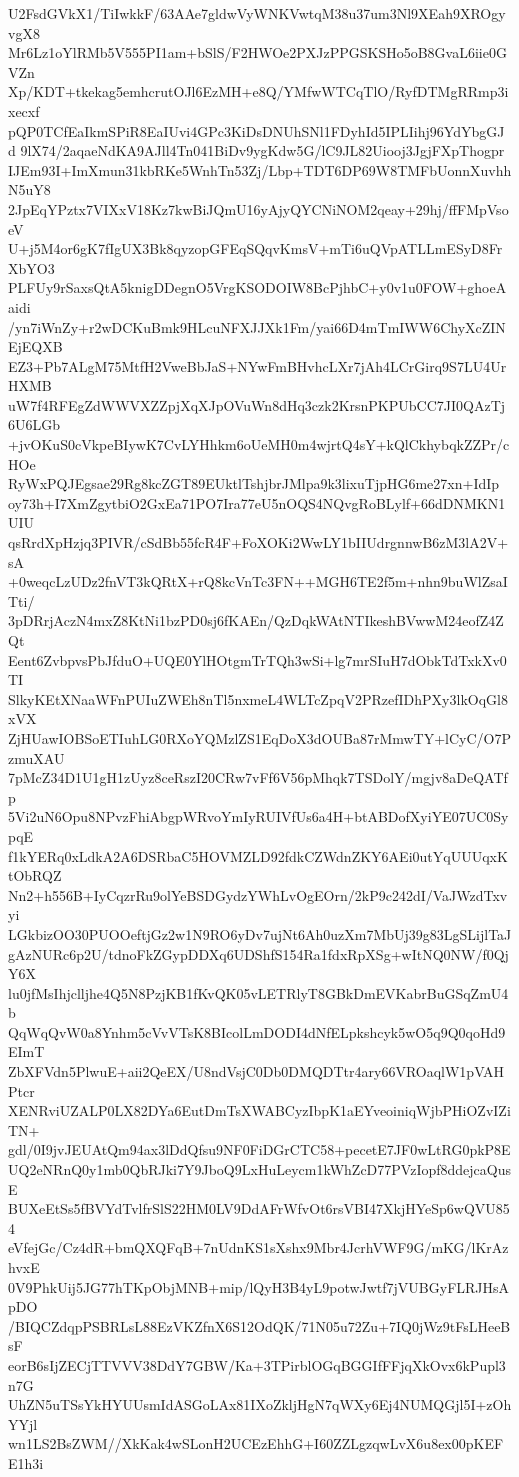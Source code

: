 U2FsdGVkX1/TiIwkkF/63AAe7gldwVyWNKVwtqM38u37um3Nl9XEah9XROgyvgX8
Mr6Lz1oYlRMb5V555PI1am+bSlS/F2HWOe2PXJzPPGSKSHo5oB8GvaL6iie0GVZn
Xp/KDT+tkekag5emhcrutOJl6EzMH+e8Q/YMfwWTCqTlO/RyfDTMgRRmp3ixecxf
pQP0TCfEaIkmSPiR8EaIUvi4GPc3KiDsDNUhSNl1FDyhId5IPLIihj96YdYbgGJd
9lX74/2aqaeNdKA9AJll4Tn041BiDv9ygKdw5G/lC9JL82Uiooj3JgjFXpThogpr
IJEm93I+ImXmun31kbRKe5WnhTn53Zj/Lbp+TDT6DP69W8TMFbUonnXuvhhN5uY8
2JpEqYPztx7VIXxV18Kz7kwBiJQmU16yAjyQYCNiNOM2qeay+29hj/ffFMpVsoeV
U+j5M4or6gK7fIgUX3Bk8qyzopGFEqSQqvKmsV+mTi6uQVpATLLmESyD8FrXbYO3
PLFUy9rSaxsQtA5knigDDegnO5VrgKSODOIW8BcPjhbC+y0v1u0FOW+ghoeAaidi
/yn7iWnZy+r2wDCKuBmk9HLcuNFXJJXk1Fm/yai66D4mTmIWW6ChyXcZINEjEQXB
EZ3+Pb7ALgM75MtfH2VweBbJaS+NYwFmBHvhcLXr7jAh4LCrGirq9S7LU4UrHXMB
uW7f4RFEgZdWWVXZZpjXqXJpOVuWn8dHq3czk2KrsnPKPUbCC7JI0QAzTj6U6LGb
+jvOKuS0cVkpeBIywK7CvLYHhkm6oUeMH0m4wjrtQ4sY+kQlCkhybqkZZPr/cHOe
RyWxPQJEgsae29Rg8kcZGT89EUktlTshjbrJMlpa9k3lixuTjpHG6me27xn+IdIp
oy73h+I7XmZgytbiO2GxEa71PO7Ira77eU5nOQS4NQvgRoBLylf+66dDNMKN1UIU
qsRrdXpHzjq3PIVR/cSdBb55fcR4F+FoXOKi2WwLY1bIIUdrgnnwB6zM3lA2V+sA
+0weqcLzUDz2fnVT3kQRtX+rQ8kcVnTc3FN++MGH6TE2f5m+nhn9buWlZsaITti/
3pDRrjAczN4mxZ8KtNi1bzPD0sj6fKAEn/QzDqkWAtNTIkeshBVwwM24eofZ4ZQt
Eent6ZvbpvsPbJfduO+UQE0YlHOtgmTrTQh3wSi+lg7mrSIuH7dObkTdTxkXv0TI
SlkyKEtXNaaWFnPUIuZWEh8nTl5nxmeL4WLTcZpqV2PRzefIDhPXy3lkOqGl8xVX
ZjHUawIOBSoETIuhLG0RXoYQMzlZS1EqDoX3dOUBa87rMmwTY+lCyC/O7PzmuXAU
7pMcZ34D1U1gH1zUyz8ceRszI20CRw7vFf6V56pMhqk7TSDolY/mgjv8aDeQATfp
5Vi2uN6Opu8NPvzFhiAbgpWRvoYmIyRUIVfUs6a4H+btABDofXyiYE07UC0SypqE
f1kYERq0xLdkA2A6DSRbaC5HOVMZLD92fdkCZWdnZKY6AEi0utYqUUUqxKtObRQZ
Nn2+h556B+IyCqzrRu9olYeBSDGydzYWhLvOgEOrn/2kP9c242dI/VaJWzdTxvyi
LGkbizOO30PUOOeftjGz2w1N9RO6yDv7ujNt6Ah0uzXm7MbUj39g83LgSLijlTaJ
gAzNURc6p2U/tdnoFkZGypDDXq6UDShfS154Ra1fdxRpXSg+wItNQ0NW/f0QjY6X
lu0jfMsIhjclljhe4Q5N8PzjKB1fKvQK05vLETRlyT8GBkDmEVKabrBuGSqZmU4b
QqWqQvW0a8Ynhm5cVvVTsK8BIcolLmDODI4dNfELpkshcyk5wO5q9Q0qoHd9EImT
ZbXFVdn5PlwuE+aii2QeEX/U8ndVsjC0Db0DMQDTtr4ary66VROaqlW1pVAHPtcr
XENRviUZALP0LX82DYa6EutDmTsXWABCyzIbpK1aEYveoiniqWjbPHiOZvIZiTN+
gdl/0I9jvJEUAtQm94ax3lDdQfsu9NF0FiDGrCTC58+pecetE7JF0wLtRG0pkP8E
UQ2eNRnQ0y1mb0QbRJki7Y9JboQ9LxHuLeycm1kWhZcD77PVzIopf8ddejcaQusE
BUXeEtSs5fBVYdTvlfrSlS22HM0LV9DdAFrWfvOt6rsVBI47XkjHYeSp6wQVU854
eVfejGc/Cz4dR+bmQXQFqB+7nUdnKS1sXshx9Mbr4JcrhVWF9G/mKG/lKrAzhvxE
0V9PhkUij5JG77hTKpObjMNB+mip/lQyH3B4yL9potwJwtf7jVUBGyFLRJHsApDO
/BIQCZdqpPSBRLsL88EzVKZfnX6S12OdQK/71N05u72Zu+7IQ0jWz9tFsLHeeBsF
eorB6sIjZECjTTVVV38DdY7GBW/Ka+3TPirblOGqBGGIfFFjqXkOvx6kPupl3n7G
UhZN5uTSsYkHYUUsmIdASGoLAx81IXoZkljHgN7qWXy6Ej4NUMQGjl5I+zOhYYjl
wn1LS2BsZWM//XkKak4wSLonH2UCEzEhhG+I60ZZLgzqwLvX6u8ex00pKEFE1h3i
